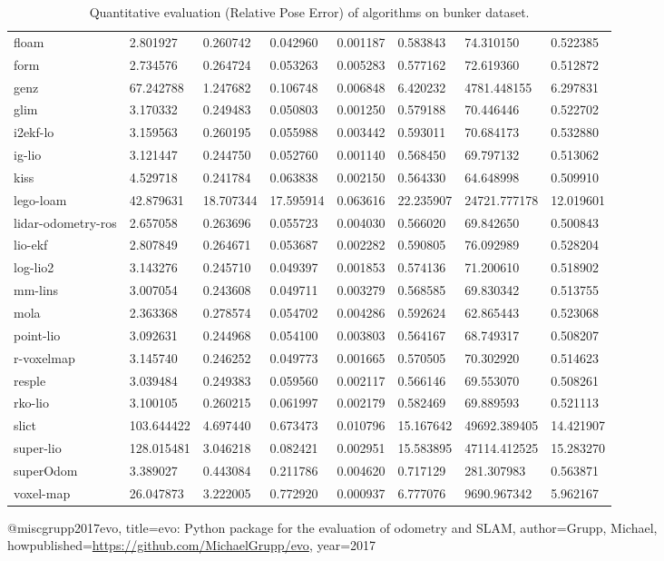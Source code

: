 \begin{table}[]
{\begin{tabular}{llllllll}
		floam & 2.801927 & 0.260742 & 0.042960 & 0.001187 & 0.583843 & 74.310150 & 0.522385 \\
		form & 2.734576 & 0.264724 & 0.053263 & 0.005283 & 0.577162 & 72.619360 & 0.512872 \\
		genz & 67.242788 & 1.247682 & 0.106748 & 0.006848 & 6.420232 & 4781.448155 & 6.297831 \\
		glim & 3.170332 & 0.249483 & 0.050803 & 0.001250 & 0.579188 & 70.446446 & 0.522702 \\
		i2ekf-lo & 3.159563 & 0.260195 & 0.055988 & 0.003442 & 0.593011 & 70.684173 & 0.532880 \\
		ig-lio & 3.121447 & 0.244750 & 0.052760 & 0.001140 & 0.568450 & 69.797132 & 0.513062 \\
		kiss & 4.529718 & 0.241784 & 0.063838 & 0.002150 & 0.564330 & 64.648998 & 0.509910 \\
		lego-loam & 42.879631 & 18.707344 & 17.595914 & 0.063616 & 22.235907 & 24721.777178 & 12.019601 \\
		lidar-odometry-ros & 2.657058 & 0.263696 & 0.055723 & 0.004030 & 0.566020 & 69.842650 & 0.500843 \\
		lio-ekf & 2.807849 & 0.264671 & 0.053687 & 0.002282 & 0.590805 & 76.092989 & 0.528204 \\
		log-lio2 & 3.143276 & 0.245710 & 0.049397 & 0.001853 & 0.574136 & 71.200610 & 0.518902 \\
		mm-lins & 3.007054 & 0.243608 & 0.049711 & 0.003279 & 0.568585 & 69.830342 & 0.513755 \\
		mola & 2.363368 & 0.278574 & 0.054702 & 0.004286 & 0.592624 & 62.865443 & 0.523068 \\
		point-lio & 3.092631 & 0.244968 & 0.054100 & 0.003803 & 0.564167 & 68.749317 & 0.508207 \\
		r-voxelmap & 3.145740 & 0.246252 & 0.049773 & 0.001665 & 0.570505 & 70.302920 & 0.514623 \\
		resple & 3.039484 & 0.249383 & 0.059560 & 0.002117 & 0.566146 & 69.553070 & 0.508261 \\
		rko-lio & 3.100105 & 0.260215 & 0.061997 & 0.002179 & 0.582469 & 69.889593 & 0.521113 \\
		slict & 103.644422 & 4.697440 & 0.673473 & 0.010796 & 15.167642 & 49692.389405 & 14.421907 \\
		super-lio & 128.015481 & 3.046218 & 0.082421 & 0.002951 & 15.583895 & 47114.412525 & 15.283270 \\
		superOdom & 3.389027 & 0.443084 & 0.211786 & 0.004620 & 0.717129 & 281.307983 & 0.563871 \\
		voxel-map & 26.047873 & 3.222005 & 0.772920 & 0.000937 & 6.777076 & 9690.967342 & 5.962167 \\
        	\end{tabular}%
        }
        	\caption{Quantitative evaluation (Relative Pose Error\cite{grupp2017evo}) of algorithms on bunker dataset.}
        	\label{table3}
\end{table}

@misc{grupp2017evo,
  title={evo: Python package for the evaluation of odometry and SLAM},
  author={Grupp, Michael},
  howpublished={\url{https://github.com/MichaelGrupp/evo}},
  year={2017}
}
